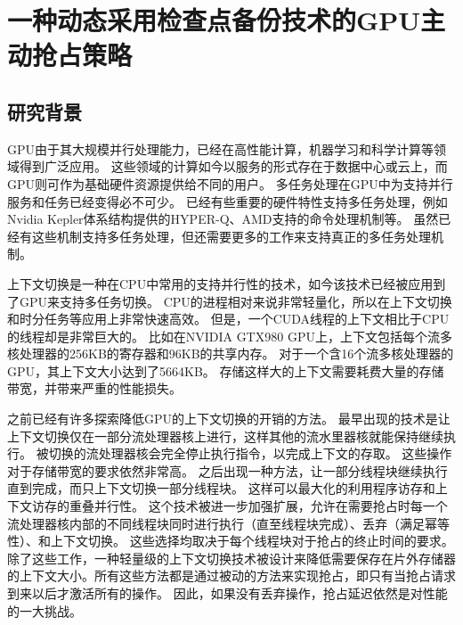 \chapter{一种动态采用检查点备份技术的GPU主动抢占策略}
\label{chap:PEP}

\section{研究背景}

GPU由于其大规模并行处理能力，已经在高性能计算，机器学习和科学计算等领域得到广泛应用。
这些领域的计算如今以服务的形式存在于数据中心或云上，而GPU则可作为基础硬件资源提供给不同的用户。
多任务处理在GPU中为支持并行服务和任务已经变得必不可少。
已经有些重要的硬件特性支持多任务处理，例如Nvidia Kepler体系结构提供的HYPER-Q、AMD支持的命令处理机制等。
虽然已经有这些机制支持多任务处理，但还需要更多的工作来支持真正的多任务处理机制。

上下文切换是一种在CPU中常用的支持并行性的技术，如今该技术已经被应用到了GPU来支持多任务切换。
CPU的进程相对来说非常轻量化，所以在上下文切换和时分任务等应用上非常快速高效。
但是，一个CUDA线程的上下文相比于CPU的线程却是非常巨大的。
比如在NVIDIA GTX980 GPU上，上下文包括每个流多核处理器的256KB的寄存器和96KB的共享内存。
对于一个含16个流多核处理器的GPU，其上下文大小达到了5664KB。
存储这样大的上下文需要耗费大量的存储带宽，并带来严重的性能损失。

之前已经有许多探索降低GPU的上下文切换的开销的方法。
最早出现的技术是让上下文切换仅在一部分流处理器核上进行，这样其他的流水里器核就能保持继续执行。
被切换的流处理器核会完全停止执行指令，以完成上下文的存取。
这些操作对于存储带宽的要求依然非常高。
之后出现一种方法，让一部分线程块继续执行直到完成，而只上下文切换一部分线程块。
这样可以最大化的利用程序访存和上下文访存的重叠并行性。
这个技术被进一步加强扩展，允许在需要抢占时每一个流处理器核内部的不同线程块同时进行执行（直至线程块完成）、丢弃（满足幂等性）、和上下文切换。
这些选择均取决于每个线程块对于抢占的终止时间的要求。
除了这些工作，一种轻量级的上下文切换技术被设计来降低需要保存在片外存储器的上下文大小。所有这些方法都是通过被动的方法来实现抢占，即只有当抢占请求到来以后才激活所有的操作。
因此，如果没有丢弃操作，抢占延迟依然是对性能的一大挑战。

